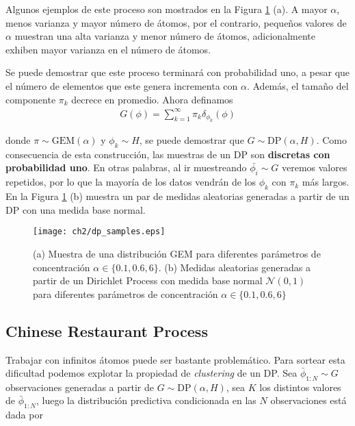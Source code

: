 Algunos ejemplos de este proceso son mostrados en la Figura \ref{img:dp_samples} (a). A mayor $\alpha$, menos varianza y mayor número de átomos, por el contrario, pequeños valores de $\alpha$ muestran una alta varianza y menor número de átomos, adicionalmente exhiben mayor varianza en el número de átomos.

Se puede demostrar que este proceso terminará con probabilidad uno, a pesar que el número de elementos que este genera incrementa con $\alpha$. Además, el tamaño del componente $\pi_{k}$ decrece en promedio. Ahora definamos 
\begin{align}
    G(\phi) = \sum_{k=1}^{\infty}\pi_{k}\delta_{\phi_{k}}(\phi)
\end{align}

donde $\pi \sim \text{GEM}(\alpha)$ y $\phi_{k} \sim H$, se puede demostrar que $G \sim \text{DP}(\alpha, H)$. Como consecuencia de esta construcción, las muestras de un DP son \textbf{discretas con probabilidad uno}. En otras palabras, al ir muestreando $\bar{\phi_{i}}\sim G$ veremos valores repetidos, por lo que la mayoría de los datos vendrán de los $\phi_{k}$ con $\pi_{k}$ más largos. En la Figura \ref{img:dp_samples} (b) muestra un par de medidas aleatorias generadas a partir de un DP con una medida base normal.\\

\begin{figure}
    \centering
    \texttt{[image: ch2/dp\_samples.eps]}
    \caption{(a) Muestra de una distribución GEM para diferentes parámetros de concentración $\alpha\in \{0.1, 0.6, 6\}$. (b) Medidas aleatorias generadas a partir de un Dirichlet Process con medida base normal $\mathcal{N}(0,1)$ para diferentes parámetros de concentración $\alpha\in \{0.1, 0.6, 6\}$}
    \label{img:dp_samples}
\end{figure}

\subsection{Chinese Restaurant Process}
\label{sec:crp}

Trabajar con infinitos átomos puede ser bastante problemático. Para sortear esta dificultad podemos explotar la propiedad de \textit{clustering} de un DP. Sea $\bar{\phi}_{1:N}\sim G$ observaciones generadas a partir de $G\sim \text{DP}(\alpha, H)$, sea $K$ los distintos valores de $\bar{\phi}_{1:N}$, luego la distribución predictiva condicionada en las $N$ observaciones está dada por

